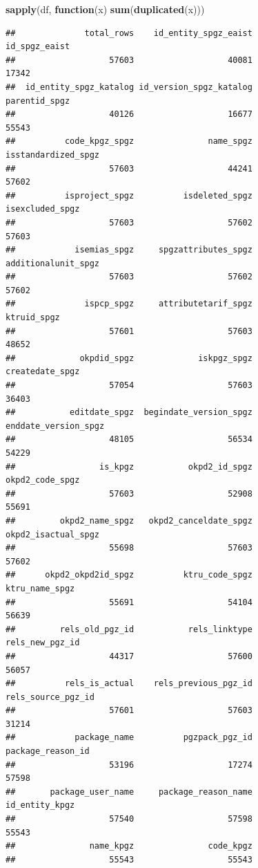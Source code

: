 \documentclass[
]{article}
\newenvironment{Shaded}{\begin{snugshade}}{\end{snugshade}}
\newcommand{\ControlFlowTok}[1]{\textcolor[rgb]{0.13,0.29,0.53}{\textbf{#1}}}
\newcommand{\FunctionTok}[1]{\textcolor[rgb]{0.13,0.29,0.53}{\textbf{#1}}}
\newcommand{\NormalTok}[1]{#1}
\begin{document}
\begin{Shaded}
\begin{Highlighting}[]
\FunctionTok{sapply}\NormalTok{(df, }\ControlFlowTok{function}\NormalTok{(x) }\FunctionTok{sum}\NormalTok{(}\FunctionTok{duplicated}\NormalTok{(x)))}
\end{Highlighting}
\end{Shaded}

\begin{verbatim}
##              total_rows    id_entity_spgz_eaist           id_spgz_eaist 
##                   57603                   40081                   17342 
##  id_entity_spgz_katalog id_version_spgz_katalog           parentid_spgz 
##                   40126                   16677                   55543 
##          code_kpgz_spgz               name_spgz     isstandardized_spgz 
##                   57603                   44241                   57602 
##          isproject_spgz          isdeleted_spgz         isexcluded_spgz 
##                   57603                   57602                   57603 
##            isemias_spgz     spgzattributes_spgz     additionalunit_spgz 
##                   57603                   57602                   57602 
##              ispcp_spgz     attributetarif_spgz             ktruid_spgz 
##                   57601                   57603                   48652 
##             okpdid_spgz             iskpgz_spgz         createdate_spgz 
##                   57054                   57603                   36403 
##           editdate_spgz  begindate_version_spgz    enddate_version_spgz 
##                   48105                   56534                   54229 
##                 is_kpgz           okpd2_id_spgz         okpd2_code_spgz 
##                   57603                   52908                   55691 
##         okpd2_name_spgz   okpd2_canceldate_spgz     okpd2_isactual_spgz 
##                   55698                   57603                   57602 
##      okpd2_okpd2id_spgz          ktru_code_spgz          ktru_name_spgz 
##                   55691                   54104                   56639 
##         rels_old_pgz_id           rels_linktype         rels_new_pgz_id 
##                   44317                   57600                   56057 
##          rels_is_actual    rels_previous_pgz_id      rels_source_pgz_id 
##                   57601                   57603                   31214 
##            package_name          pgzpack_pgz_id       package_reason_id 
##                   53196                   17274                   57598 
##       package_user_name     package_reason_name          id_entity_kpgz 
##                   57540                   57598                   55543 
##               name_kpgz               code_kpgz 
##                   55543                   55543
\end{verbatim}
\end{document}
